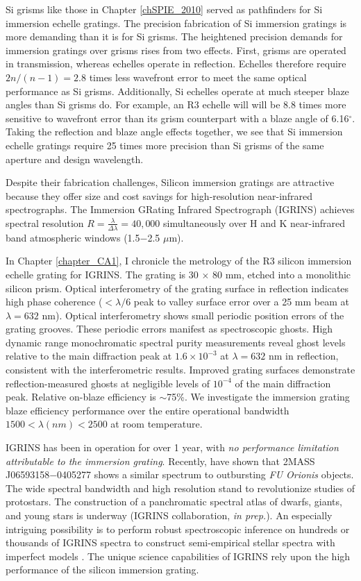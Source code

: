 Si grisms like those in Chapter \ref{chSPIE_2010} served as pathfinders for Si immersion echelle gratings.  The precision fabrication of Si immersion gratings is more demanding than it is for Si grisms.  The heightened precision demands for immersion gratings over grisms rises from two effects.  First, grisms are operated in transmission, whereas echelles operate in reflection.  Echelles therefore require $2n/(n-1) = 2.8$ times less wavefront error to meet the same optical performance as Si grisms.  Additionally, Si echelles operate at much steeper blaze angles than Si grisms do.  For example, an R3 echelle will will be 8.8 times more sensitive to wavefront error than its grism counterpart with a blaze angle of 6.16$^\circ$.  Taking the reflection and blaze angle effects together, we see that Si immersion echelle gratings require 25 times more precision than Si grisms of the same aperture and design wavelength.  

Despite their fabrication challenges, Silicon immersion gratings are attractive because they offer size and cost savings for high-resolution near-infrared spectrographs.  The Immersion GRating Infrared Spectrograph (IGRINS) \cite{} achieves spectral resolution $R=\frac{\lambda}{\Delta \lambda} = 40,000$ simultaneously over H and K near-infrared band atmospheric windows (1.5$-$2.5 $\mu$m).  

In Chapter \ref{chapter_CA1}, I chronicle the metrology of the R3 silicon immersion echelle grating for IGRINS.  The grating is 30 $\times$ 80 mm, etched into a monolithic silicon prism.  Optical interferometry of the grating surface in reflection indicates high phase coherence ($< \lambda/6$ peak to valley surface error over a 25 mm beam at $\lambda=632$ nm).  Optical interferometry shows small periodic position errors of the grating grooves.  These periodic errors manifest as spectroscopic ghosts.  High dynamic range monochromatic spectral purity measurements reveal ghost levels relative to the main diffraction peak at $1.6 \times 10^{-3}$ at $\lambda = 632$ nm in reflection, consistent with the interferometric results.  Improved grating surfaces demonstrate reflection-measured ghosts at negligible levels of $10^{-4}$ of the main diffraction peak.  Relative on-blaze efficiency is $\sim$75\%.  We investigate the immersion grating blaze efficiency performance over the entire operational bandwidth $1500 < \lambda(nm) < 2500$ at room temperature.

IGRINS has been in operation for over 1 year, with \emph{no performance limitation attributable to the immersion grating}.  Recently, \citet{2015ATel.6901....1P} have shown that 2MASS J06593158$-$0405277 shows a similar spectrum to outbursting \emph{FU Orionis} objects.  The wide spectral bandwidth and high resolution stand to revolutionize studies of protostars.  The construction of a panchromatic spectral atlas of dwarfs, giants, and young stars is underway (IGRINS collaboration, \emph{in prep.}).  An especially intriguing possibility is to perform robust spectroscopic inference on hundreds or thousands of IGRINS spectra to construct semi-empirical stellar spectra with imperfect models \citep{2014arXiv1412.5177C}.  The unique science capabilities of IGRINS rely upon the high performance of the silicon immersion grating.

